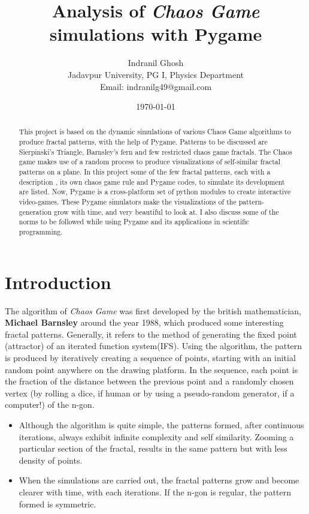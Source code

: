 \documentclass{article}
\title{\textbf{Analysis of \textit{Chaos Game} simulations with Pygame}}
\author{Indranil Ghosh\\Jadavpur University, PG I, Physics Department\\Email: indranilg49@gmail.com}
\date{\today}
\begin{document}
\maketitle

\tableofcontents

\begin{abstract}
This project is based on the dynamic simulations of various Chaos Game algorithms to produce fractal patterns, with the help of Pygame. Patterns to be discussed are Sierpinski’s Triangle, Barnsley’s fern and few restricted chaos game fractals. The Chaos game makes use of a random process to produce visualizations of self-similar fractal patterns on a plane. In this project some of the few fractal patterns, each with a description , its own chaos game rule and Pygame codes, to simulate its development are listed. Now, Pygame is a cross-platform set of python modules to create interactive video-games. These Pygame simulators make the visualizations of the pattern-generation grow with time, and very beautiful to look at. I also discuss some of the norms to be followed while using Pygame and its applications in scientific programming. 
\end{abstract}

\section{Introduction}
The algorithm of \textit{Chaos Game} was first developed by the british mathematician, \textbf{Michael Barnsley} around the year 1988, which produced some interesting fractal patterns. Generally, it refers to the method of generating the fixed point (attractor) of an iterated function system(IFS). Using the algorithm, the pattern is produced by iteratively creating a sequence of points, starting with an initial random point anywhere on the drawing platform. In the sequence, each point is the fraction of the distance between the previous point and a randomly chosen vertex (by rolling a dice, if human or by using a pseudo-random generator, if a computer!) of the n-gon.\\

\begin{itemize}
\item Although the algorithm is quite simple, the patterns formed, after continuous iterations, always exhibit infinite complexity and self similarity. Zooming a particular section of the fractal, results in the same pattern but with less density of points.\\
\item When the simulations are carried out, the fractal patterns grow and become clearer with time, with each iterations. If the n-gon is regular, the pattern formed is symmetric.
\end{itemize}
\end{document}
